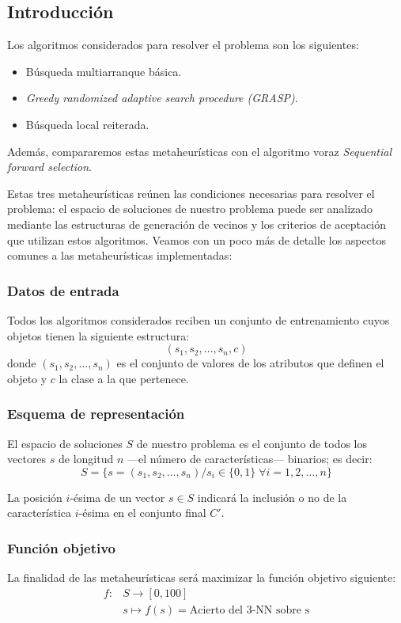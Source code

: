 \documentclass[a4paper, 11pt, titlepage]{article}
\begin{document}
    \subsection{Introducción}

    Los algoritmos considerados para resolver el problema son los siguientes:
    \begin{itemize}
        \item Búsqueda multiarranque básica.
        \item \emph{Greedy randomized adaptive search procedure (GRASP)}.
        \item Búsqueda local reiterada.
    \end{itemize}

    Además, compararemos estas metaheurísticas con el algoritmo voraz \emph{Sequential forward selection}.

    Estas tres metaheurísticas reúnen las condiciones necesarias para resolver el problema: el espacio de soluciones de nuestro problema puede ser analizado mediante las estructuras de generación de vecinos y los criterios de aceptación que utilizan estos algoritmos. Veamos con un poco más de detalle los aspectos comunes a las metaheurísticas implementadas:

    \subsubsection*{Datos de entrada}
    Todos los algoritmos considerados reciben un conjunto de entrenamiento cuyos objetos tienen la siguiente estructura:
    \[
    (s_1, s_2, \dots, s_n, c)
    \]
    donde $(s_1, s_2, \dots, s_n)$ es el conjunto de valores de los atributos que definen el objeto y $c$ la clase a la que pertenece.

    \subsubsection*{Esquema de representación}
    El espacio de soluciones $S$ de nuestro problema es el conjunto de todos los vectores $s$ de longitud $n$ ---el número de características--- binarios; es decir:
    \[
    S = \{s = (s_1, s_2, \dots, s_n) / s_i \in \{0,1\} \;\forall i = 1, 2, \dots, n\}
    \]

    La posición $i$-ésima de un vector $s \in S$ indicará la inclusión o no de la característica $i$-ésima en el conjunto final $C'$.

    \subsubsection*{Función objetivo}
    La finalidad de las metaheurísticas será maximizar la función objetivo siguiente:
    \begin{align*}
        f \colon &S \to [0,100] \\
        &s \mapsto f(s) = \textrm{Acierto del 3-NN sobre s}
    \end{align*}
\end{document}
